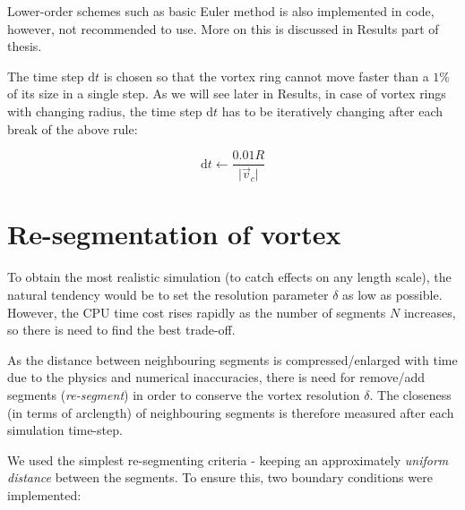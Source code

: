 Lower-order schemes such as basic Euler method is also implemented in code, however, not recommended to use. More on this is discussed in Results part of thesis.

The time step $\text{d}t$ is chosen so that the vortex ring cannot move faster than a $1\%$ of its size in a single step. As we will see later in Results, in case of vortex rings with changing radius, the time step $\text{d}t$ has to be iteratively changing after each break of the above rule:

\begin{equation}
\text{d}t \leftarrow \frac{0.01 R}{\vert \vec{v}_c \vert}
\end{equation}

\newpage

\section{Re-segmentation of vortex}

To obtain the most realistic simulation (to catch effects on any length scale), the natural tendency would be to set the resolution parameter $\delta$ as low as possible. However, the CPU time cost rises rapidly as the number of segments $N$ increases, so there is need to find the best trade-off.

As the distance between neighbouring segments is compressed/enlarged with time due to the physics and numerical inaccuracies, there is need for remove/add segments (\textit{re-segment}) in order to conserve the vortex resolution $\delta$. The closeness (in terms of arclength) of neighbouring segments is therefore measured after each simulation time-step.

We used the simplest re-segmenting criteria - keeping an approximately \textit{uniform distance} between the segments. To ensure this, two boundary conditions were implemented:

